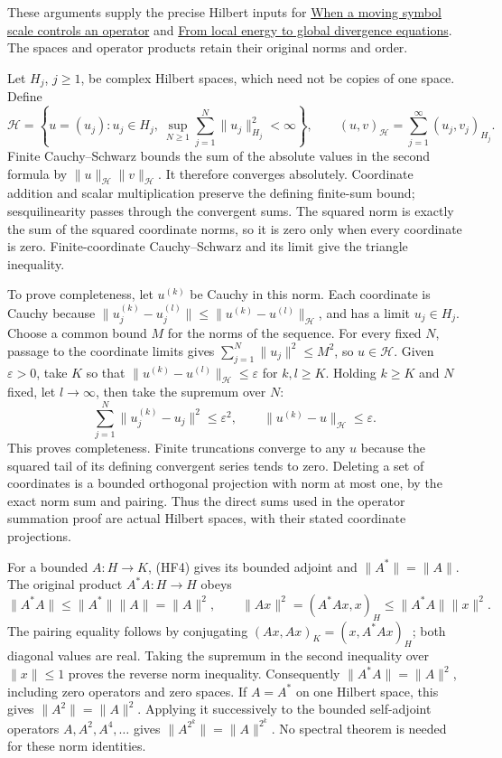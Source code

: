 \documentclass[
  11pt,
]{article}
\begin{document}
These arguments supply the precise Hilbert inputs for
\href{metric-operator-bounds.pdf}{When a moving symbol scale controls an
operator} and \href{divergence-solvability.pdf}{From local energy to
global divergence equations}. The spaces and operator products retain
their original norms and order.

Let \(H_j\), \(j\geq1\), be complex Hilbert spaces, which need not be
copies of one space. Define \[
 \mathcal H=\left\{u=(u_j):u_j\in H_j,\
       \sup_{N\geq1}\sum_{j=1}^N\|u_j\|_{H_j}^2<\infty\right\},
 \qquad
 (u,v)_{\mathcal H}=\sum_{j=1}^{\infty}(u_j,v_j)_{H_j}.
 \tag{HF20}
\] Finite Cauchy--Schwarz bounds the sum of the absolute values in the
second formula by \(\|u\|_{\mathcal H}\|v\|_{\mathcal H}\). It therefore
converges absolutely. Coordinate addition and scalar multiplication
preserve the defining finite-sum bound; sesquilinearity passes through
the convergent sums. The squared norm is exactly the sum of the squared
coordinate norms, so it is zero only when every coordinate is zero.
Finite-coordinate Cauchy--Schwarz and its limit give the triangle
inequality.

To prove completeness, let \(u^{(k)}\) be Cauchy in this norm. Each
coordinate is Cauchy because
\(\|u_j^{(k)}-u_j^{(l)}\|\leq\|u^{(k)}-u^{(l)}\|_{\mathcal H}\), and has
a limit \(u_j\in H_j\). Choose a common bound \(M\) for the norms of the
sequence. For every fixed \(N\), passage to the coordinate limits gives
\(\sum_{j=1}^N\|u_j\|^2\leq M^2\), so \(u\in\mathcal H\). Given
\(\varepsilon>0\), take \(K\) so that
\(\|u^{(k)}-u^{(l)}\|_{\mathcal H}\leq\varepsilon\) for \(k,l\geq K\).
Holding \(k\geq K\) and \(N\) fixed, let \(l\to\infty\), then take the
supremum over \(N\): \[
 \sum_{j=1}^N\|u_j^{(k)}-u_j\|^2\leq\varepsilon^2,\qquad
 \|u^{(k)}-u\|_{\mathcal H}\leq\varepsilon.
 \tag{HF21}
\] This proves completeness. Finite truncations converge to any \(u\)
because the squared tail of its defining convergent series tends to
zero. Deleting a set of coordinates is a bounded orthogonal projection
with norm at most one, by the exact norm sum and pairing. Thus the
direct sums used in the operator summation proof are actual Hilbert
spaces, with their stated coordinate projections.

For a bounded \(A:H\to K\), (HF4) gives its bounded adjoint and
\(\|A^*\|=\|A\|\). The original product \(A^*A:H\to H\) obeys \[
 \|A^*A\|\leq\|A^*\|\|A\|=\|A\|^2,\qquad
 \|Ax\|^2=(A^*Ax,x)_H\leq\|A^*A\|\|x\|^2.
 \tag{HF22}
\] The pairing equality follows by conjugating
\((Ax,Ax)_K=(x,A^*Ax)_H\); both diagonal values are real. Taking the
supremum in the second inequality over \(\|x\|\leq1\) proves the reverse
norm inequality. Consequently \(\|A^*A\|=\|A\|^2\), including zero
operators and zero spaces. If \(A=A^*\) on one Hilbert space, this gives
\(\|A^2\|=\|A\|^2\). Applying it successively to the bounded
self-adjoint operators \(A,A^2,A^4,\ldots\) gives
\(\|A^{2^k}\|=\|A\|^{2^k}\). No spectral theorem is needed for these
norm identities.
\end{document}
